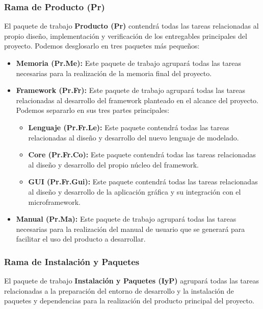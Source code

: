 \subsubsection{Rama de Producto (Pr)}
El paquete de trabajo \textbf{Producto (Pr)} contendrá todas las tareas
relacionadas al propio diseño, implementación y verificación de los entregables
principales del proyecto. Podemos desglosarlo en tres paquetes más pequeños:
\begin{itemize}
    \item \textbf{Memoria (Pr.Me):} Este paquete de trabajo agrupará todas las
    tareas necesarias para la realización de la memoria final del proyecto.
    \item \textbf{Framework (Pr.Fr):} Este paquete de trabajo agrupará todas las
    tareas relacionadas al desarrollo del framework planteado en el alcance del
    proyecto. Podemos separarlo en sus tres partes principales:
    \begin{itemize}
        \item \textbf{Lenguaje (Pr.Fr.Le):} Este paquete contendrá todas las
        tareas relacionadas al diseño y desarrollo del nuevo lenguaje de
        modelado.
        \item \textbf{Core (Pr.Fr.Co):} Este paquete contendrá todas las
        tareas relacionadas al diseño y desarrollo del propio núcleo del
        framework.
        \item \textbf{GUI (Pr.Fr.Gui):} Este paquete contendrá todas las
        tareas relacionadas al diseño y desarrollo de la aplicación gráfica y su
        integración con el microframework. 
    \end{itemize}
    \item \textbf{Manual (Pr.Ma):} Este paquete de trabajo agrupará todas las
    tareas necesarias para la realización del manual de usuario que se generará
    para facilitar el uso del producto a desarrollar.
\end{itemize}

\subsubsection{Rama de Instalación y Paquetes}
El paquete de trabajo \textbf{Instalación y Paquetes (IyP)} agrupará todas las
tareas relacionadas a la preparación del entorno de desarrollo y la instalación
de paquetes y dependencias para la realización del producto principal del
proyecto.